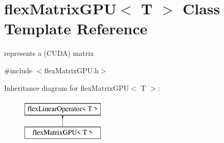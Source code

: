 \hypertarget{classflex_matrix_g_p_u}{}\section{flex\+Matrix\+G\+PU$<$ T $>$ Class Template Reference}
\label{classflex_matrix_g_p_u}


represents a (C\+U\+DA) matrix  




{\ttfamily \#include $<$flex\+Matrix\+G\+P\+U.\+h$>$}

Inheritance diagram for flex\+Matrix\+G\+PU$<$ T $>$\+:\begin{figure}[H]
\begin{center}
\leavevmode
\includegraphics[height=2.000000cm]{classflex_matrix_g_p_u}
\end{center}
\end{figure}
